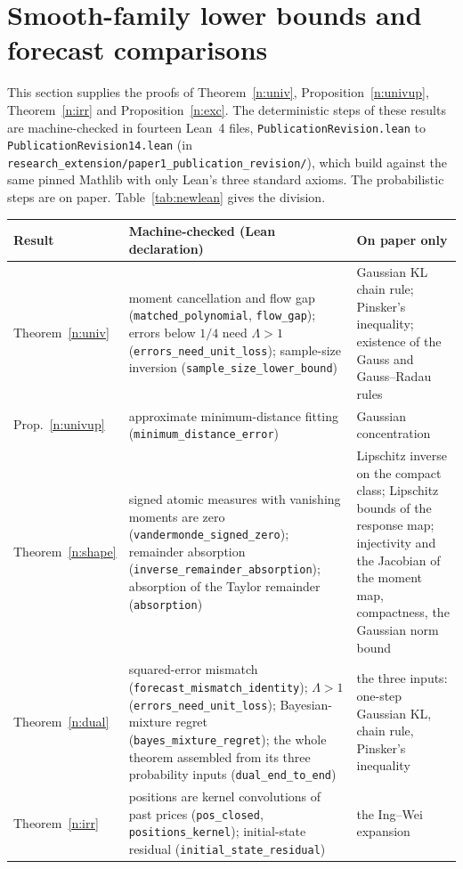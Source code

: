 \documentclass[12pt]{article}
\theoremstyle{definition}
\theoremstyle{remark}
\begin{document}
\section{Smooth-family lower bounds and forecast comparisons}\label{app:univirr}

This section supplies the proofs of Theorem~\ref{n:univ}, Proposition~\ref{n:univup}, Theorem~\ref{n:irr} and Proposition~\ref{n:exc}. The deterministic steps of these results are machine-checked in fourteen Lean~4 files, \nolinkurl{PublicationRevision.lean} to \nolinkurl{PublicationRevision14.lean} (in \nolinkurl{research_extension/paper1_publication_revision/}), which build against the same pinned Mathlib with only Lean's three standard axioms. The probabilistic steps are on paper. Table~\ref{tab:newlean} gives the division.
\begin{table}[ht]\centering\small
\begin{tabular}{>{\raggedright\arraybackslash}p{}>{\raggedright\arraybackslash}p{}>{\raggedright\arraybackslash}p{}}\toprule
Result & Machine-checked (Lean declaration) & On paper only\\\midrule
Theorem~\ref{n:univ} & moment cancellation and flow gap (\texttt{matched\_polynomial}, \texttt{flow\_gap}); errors below $1/4$ need $\Lambda>1$ (\texttt{errors\_need\_unit\_loss}); sample-size inversion (\texttt{sample\_size\_lower\_bound}) & Gaussian KL chain rule; Pinsker's inequality; existence of the Gauss and Gauss--Radau rules\\
Prop.~\ref{n:univup} & approximate minimum-distance fitting (\texttt{minimum\_distance\_error}) & Gaussian concentration\\
Theorem~\ref{n:shape} & signed atomic measures with vanishing moments are zero (\texttt{vandermonde\_signed\_zero}); remainder absorption (\texttt{inverse\_remainder\_absorption}); absorption of the Taylor remainder (\nolinkurl{absorption}) & Lipschitz inverse on the compact class; Lipschitz bounds of the response map; injectivity and the Jacobian of the moment map, compactness, the Gaussian norm bound\\
Theorem~\ref{n:dual} & squared-error mismatch (\texttt{forecast\_mismatch\_identity}); $\Lambda>1$ (\texttt{errors\_need\_unit\_loss}); Bayesian-mixture regret (\texttt{bayes\_mixture\_regret}); the whole theorem assembled from its three probability inputs (\texttt{dual\_end\_to\_end}) & the three inputs: one-step Gaussian KL, chain rule, Pinsker's inequality\\
Theorem~\ref{n:irr} & positions are kernel convolutions of past prices (\texttt{pos\_closed}, \texttt{positions\_kernel}); initial-state residual (\texttt{initial\_state\_residual}) & the Ing--Wei expansion\\

\end{tabular}
\end{table}
\end{document}
